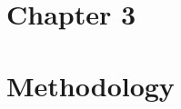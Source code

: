\documentclass[12pt]{article}
\begin{document}
\newpage
\begin{center}
    \section*{Chapter 3}
    \section*{Methodology}
\end{center}
\end{document}
